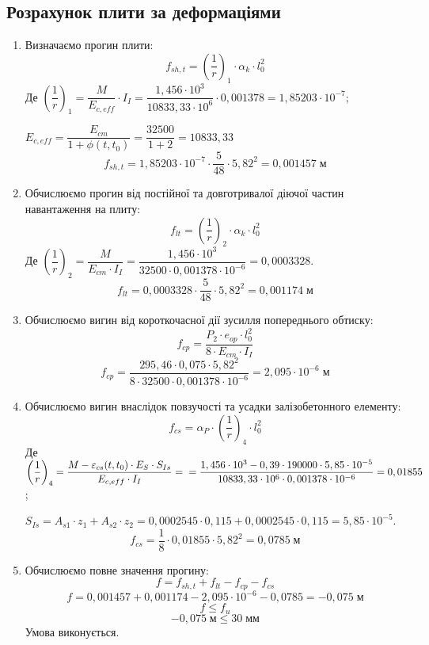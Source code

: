 \documentclass[a4paper,14pt]{article}
\begin{document}
\subsection{Розрахунок плити за деформаціями}
\begin{enumerate}
    \item Визначаємо прогин плити:
        \begin{equation}
            f_{sh,t} = \left(\dfrac{1}{r}\right)_1 \cdot \alpha_k \cdot l_0^2
        \end{equation}
        Де $\left(\dfrac{1}{r}\right)_1 = \dfrac{M}{E_{c,eff}} \cdot I_I = \dfrac{1,456 \cdot 10^3}{10833,33 \cdot 10^6} \cdot 0,001378 = 1,85203 \cdot 10^{-7}$;

        $E_{c,eff} = \dfrac{E_{cm}}{1 + \phi(t,t_0)} = \dfrac{32500}{1 + 2} = 10833,33$
        $$f_{sh,t} = 1,85203 \cdot 10^{-7} \cdot \dfrac{5}{48} \cdot 5,82^2 = 0,001457\;\textit{м}$$
    \item Обчислюємо прогин від постійної та довготривалої діючої частин навантаження на плиту:
        \begin{equation}
            f_{lt} = \left(\dfrac{1}{r}\right)_2 \cdot \alpha_k \cdot l_0^2
        \end{equation}    
        Де $\left(\dfrac{1}{r}\right)_2 = \dfrac{M}{E_{cm} \cdot I_I} = \dfrac{1,456 \cdot 10^3}{32500 \cdot 0,001378 \cdot 10^{-6}} = 0,0003328$.
        $$f_{lt} = 0,0003328 \cdot \dfrac{5}{48} \cdot 5,82^2 = 0,001174\;\textit{м}$$
    \item Обчислюємо вигин від короткочасної дії зусилля попереднього обтиску:
        \begin{equation}
            f_{cp} = \dfrac{P_2 \cdot e_{op} \cdot l_0^2}{8 \cdot E_{cm} \cdot I_I}
        \end{equation}
        $$f_{cp} = \dfrac{295,46 \cdot 0,075 \cdot 5,82^2}{8 \cdot 32500 \cdot 0,001378 \cdot 10^{-6}} = 2,095 \cdot 10^{-6}\;\textit{м}$$
    \item Обчислюємо вигин внаслідок повзучості та усадки залізобетонного елементу:
        \begin{equation}
            f_{cs} = \alpha_P \cdot \left(\dfrac{1}{r}\right)_4 \cdot l_0^2
        \end{equation}
        Де $\left(\dfrac{1}{r}\right)_4 = \dfrac{M - \epsilon_{cs}(t,t_0) \cdot E_S \cdot S_{Is}}{E_{c,eff} \cdot I_I} =\\= \dfrac{1,456 \cdot 10^3 - 0,39 \cdot 190000 \cdot 5,85 \cdot 10^{-5}}{10833,33 \cdot 10^6 \cdot 0,001378 \cdot 10^{-6}} = 0,01855$;

        $S_{Is} = A_{s1} \cdot z_1 + A_{s2} \cdot z_2 = 0,0002545 \cdot 0,115 + 0,0002545 \cdot 0,115 = 5,85 \cdot 10^{-5}$.
        $$f_{cs} = \dfrac{1}{8} \cdot 0,01855 \cdot 5,82^2 = 0,0785\;\textit{м}$$
    \item Обчислюємо повне значення прогину:
        \begin{equation}
            f = f_{sh,t} + f_{lt} - f_{cp} - f_{cs}
        \end{equation}
        $$f = 0,001457 + 0,001174 - 2,095 \cdot 10^{-6} - 0,0785 = -0,075\;\textit{м}$$
        $$f \leq f_u$$
        $$-0,075\;\textit{м} \leq 30\;\textit{мм}$$
        Умова виконується.
\end{enumerate}
\newpage
\end{document}
